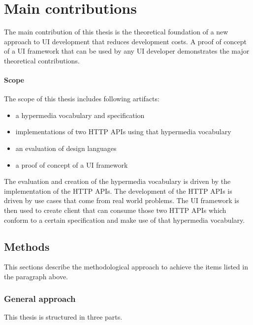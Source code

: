 \section{Main contributions}\label{contributions}
The main contribution of this thesis is the theoretical foundation of a new approach to UI development that reduces development costs. A proof of concept of a UI framework that can be used by any UI developer demonstrates the major theoretical contributions.

\paragraph{Scope}
The scope of this thesis includes following artifacts:
\begin{itemize}
\item a hypermedia vocabulary and specification
\item implementations of two HTTP APIs using that hypermedia vocabulary
\item an evaluation of design languages
\item a proof of concept of a UI framework
\end{itemize}
The evaluation and creation of the hypermedia vocabulary is driven by the implementation of the HTTP APIs. The development of the HTTP APIs is driven by use cases that come from real world problems. The UI framework is then used to create client that can consume those two HTTP APIs which conform to a certain specification and make use of that hypermedia vocabulary.

\subsection{Methods}
This sections describe the methodological approach to achieve the items listed in the paragraph above.

\subsubsection{General approach}
This thesis is structured in three parts.

